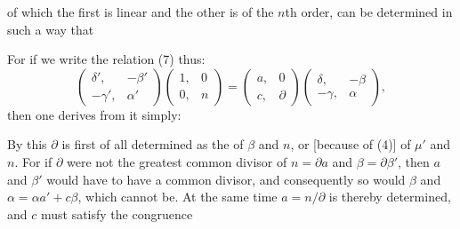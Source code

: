 of which the first is linear and the other is of the $n$th order, can be
determined in such a way that


For if we write the relation (7) thus:
\[
\begin{pmatrix} \delta', & -\beta' \\ -\gamma', & \alpha' \end{pmatrix}\begin{pmatrix} 1, & 0 \\ 0, & n \end{pmatrix} = \begin{pmatrix} a, & 0 \\ c, & \partial \end{pmatrix}\begin{pmatrix} \delta, & -\beta \\ -\gamma, & \alpha \end{pmatrix},
\]
then one derives from it simply:


By this $\partial$ is first of all determined as the  of $\beta$ and $n$, or [because of (4)] of $\mu'$ and $n$. For if
$\partial$ were not the greatest common divisor of $n=\partial a$ and
$\beta=\partial\beta'$, then $a$ and $\beta'$ would have to have a common
divisor, and consequently so would $\beta$ and $\alpha=\alpha a'+c\beta$, which
cannot be. At the same time $a=n/\partial$ is thereby determined, and $c$ must
satisfy the congruence

